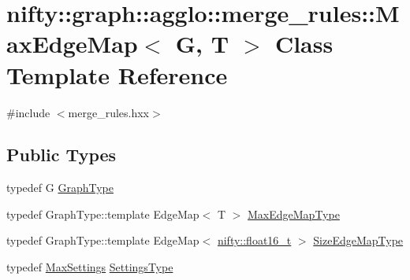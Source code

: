 \hypertarget{classnifty_1_1graph_1_1agglo_1_1merge__rules_1_1MaxEdgeMap}{}\section{nifty\+:\+:graph\+:\+:agglo\+:\+:merge\+\_\+rules\+:\+:Max\+Edge\+Map$<$ G, T $>$ Class Template Reference}
\label{classnifty_1_1graph_1_1agglo_1_1merge__rules_1_1MaxEdgeMap}


{\ttfamily \#include $<$merge\+\_\+rules.\+hxx$>$}

\subsection*{Public Types}
\begin{DoxyCompactItemize}
\item 
typedef G \hyperlink{classnifty_1_1graph_1_1agglo_1_1merge__rules_1_1MaxEdgeMap_a7b996d3f4737ff2b77cca85520e62510}{Graph\+Type}
\item 
typedef Graph\+Type\+::template Edge\+Map$<$ T $>$ \hyperlink{classnifty_1_1graph_1_1agglo_1_1merge__rules_1_1MaxEdgeMap_a7ebdeaafb5f49f80a7c43206826a706b}{Max\+Edge\+Map\+Type}
\item 
typedef Graph\+Type\+::template Edge\+Map$<$ \hyperlink{namespacenifty_a20031b62bd5c16b943905d43a8ed361a}{nifty\+::float16\+\_\+t} $>$ \hyperlink{classnifty_1_1graph_1_1agglo_1_1merge__rules_1_1MaxEdgeMap_aed9c04ef6558fb988fb2bb2a49a3d4a3}{Size\+Edge\+Map\+Type}
\item 
typedef \hyperlink{structnifty_1_1graph_1_1agglo_1_1merge__rules_1_1MaxSettings}{Max\+Settings} \hyperlink{classnifty_1_1graph_1_1agglo_1_1merge__rules_1_1MaxEdgeMap_a7123769ad8199741d682d9de6be59ca3}{Settings\+Type}
\end{DoxyCompactItemize}
